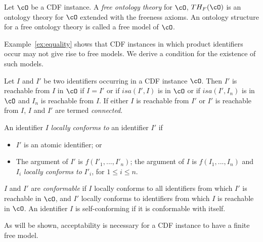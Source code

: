 \begin{definition}
Let $\cO$ be a CDF instance.  A {\em free ontology theory} for $\cO$,
$TH_F(\cO)$ is an ontology theory for $\cO$ extended with the freeness
axioms.  An ontology structure for a free ontology theory is called a
free model of $\cO$.
\end{definition}

Example~\ref{ex:equality} shows that CDF instances in which product
identifiers occur may not give rise to free models.  We derive a
condition for the existence of such models.

\begin{definition} \label{def:conformable}
Let $I$ and $I'$ be two identifiers occurring in a CDF instance $\cO$.
Then $I'$ is reachable from $I$ in $\cO$ if $I = I'$ or if $isa(I',I)$
is in $\cO$ or if $isa(I',I_n)$ is in $\cO$ and $I_n$ is reachable
from $I$.  If either $I$ is reachable from $I'$ or $I'$ is reachable
from $I$, $I$ and $I'$ are termed {\em connected}.

An identifier $I$ {\em locally conforms to} an identifier $I'$ if 
\begin{itemize}
\item $I'$ is an atomic identifier; or 
\item The argument of $I'$ is $f(I'_1,...,I'_n)$; the argument of  $I$
is $f(I_1,...,I_n)$ and $I_i$ {\em locally conforms to} $I'_i$, for $1
\leq i \leq n$.
\end{itemize}
$I$ and $I'$ are {\em conformable} if $I$ locally conforms to all
identifiers from which $I'$ is reachable in $\cO$, and $I'$ locally
conforms to identifiers from which $I$ is reachable in $\cO$.  An
identifier $I$ is self-conforming if it is conformable with itself.
\end{definition}

As will be shown, acceptability is necessary for a CDF instance to
have a finite free model.

